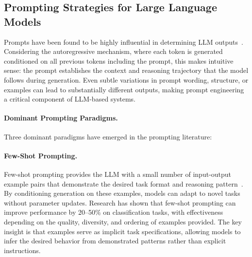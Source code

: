 
\subsection{Prompting Strategies for Large Language Models}
\label{sec:background_prompts}

Prompts have been found to be highly influential in determining LLM outputs~\citep{brown2020language, wei2022chain}. Considering the autoregressive mechanism, where each token is generated conditioned on all previous tokens including the prompt, this makes intuitive sense: the prompt establishes the context and reasoning trajectory that the model follows during generation. Even subtle variations in prompt wording, structure, or examples can lead to substantially different outputs, making prompt engineering a critical component of LLM-based systems.

\paragraph{Dominant Prompting Paradigms.}

Three dominant paradigms have emerged in the prompting literature:

\paragraph{Few-Shot Prompting.}
Few-shot prompting provides the LLM with a small number of input-output example pairs that demonstrate the desired task format and reasoning pattern~\citep{brown2020language}. By conditioning generation on these examples, models can adapt to novel tasks without parameter updates. Research has shown that few-shot prompting can improve performance by 20--50\% on classification tasks, with effectiveness depending on the quality, diversity, and ordering of examples provided. The key insight is that examples serve as implicit task specifications, allowing models to infer the desired behavior from demonstrated patterns rather than explicit instructions.

